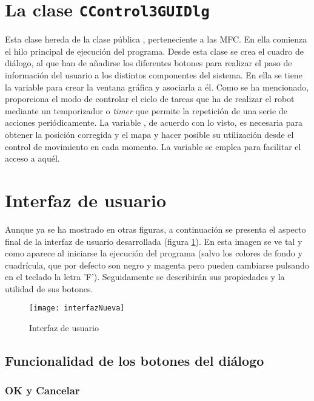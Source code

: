 \section{La clase \texttt{CControl3GUIDlg}}
Esta clase hereda de la clase pública , perteneciente a las MFC. En ella comienza el hilo principal de ejecución del programa. Desde esta clase se crea el cuadro de diálogo, al que han de añadirse los diferentes botones para realizar el paso de información del usuario a los distintos componentes del sistema. En ella se tiene la variable  para crear la ventana gráfica y asociarla a él. Como se ha mencionado, proporciona el modo de controlar el ciclo de tareas que ha de realizar el robot mediante un temporizador o \emph{timer} que permite la repetición de una serie de acciones periódicamente. La variable , de acuerdo con lo visto, es necesaria para obtener la posición corregida y el mapa y hacer posible su utilización desde el control de movimiento en cada momento. La variable  se emplea para facilitar el acceso a aquél. %

\section{Interfaz de usuario}
Aunque ya se ha mostrado en otras figuras, a continuación se presenta el aspecto final de la interfaz de usuario desarrollada (figura \ref{fg:interfaz}). En esta imagen se ve tal y como aparece al iniciarse la ejecución del programa (salvo los colores de fondo y cuadrícula, que por defecto son negro y magenta pero pueden cambiarse pulsando en el teclado la letra 'F'). Seguidamente se describirán sus propiedades y la utilidad de sus botones.

\begin{figure}[h]
  \centering\texttt{[image: interfazNueva]}\\
  \caption{Interfaz de usuario}\label{fg:interfaz}
\end{figure}


\subsection{Funcionalidad de los botones del diálogo}\label{botones}

\subsubsection{OK y Cancelar}

